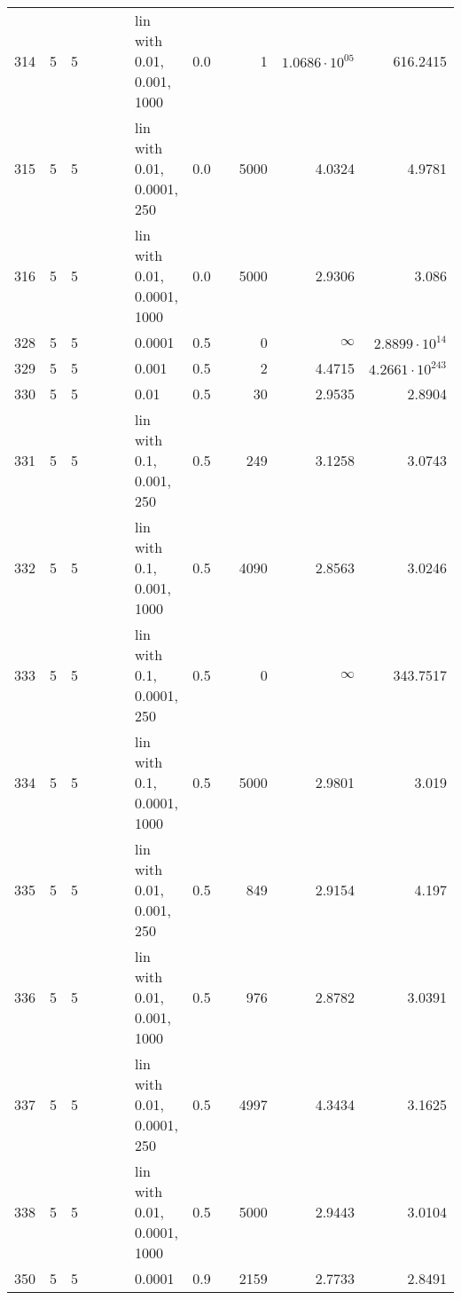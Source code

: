 \begin{longtable}{lrrrrrlrrrrr}
 314 &       5 & 5 &   &   &   &  lin with 0.01, 0.001, 1000 &  0.0 &        &       1 &  $1.0686\cdot 10^{05}$ &               616.2415 \\
 315 &       5 & 5 &   &   &   &  lin with 0.01, 0.0001, 250 &  0.0 &        &    5000 &                 4.0324 &                 4.9781 \\
 316 &       5 & 5 &   &   &   & lin with 0.01, 0.0001, 1000 &  0.0 &        &    5000 &                 2.9306 &                  3.086 \\
 328 &       5 & 5 &   &   &   &                      0.0001 &  0.5 &        &       0 &               $\infty$ &  $2.8899\cdot 10^{14}$ \\
 329 &       5 & 5 &   &   &   &                       0.001 &  0.5 &        &       2 &                 4.4715 & $4.2661\cdot 10^{243}$ \\
 330 &       5 & 5 &   &   &   &                        0.01 &  0.5 &        &      30 &                 2.9535 &                 2.8904 \\
 331 &       5 & 5 &   &   &   &    lin with 0.1, 0.001, 250 &  0.5 &        &     249 &                 3.1258 &                 3.0743 \\
 332 &       5 & 5 &   &   &   &   lin with 0.1, 0.001, 1000 &  0.5 &        &    4090 &                 2.8563 &                 3.0246 \\
 333 &       5 & 5 &   &   &   &   lin with 0.1, 0.0001, 250 &  0.5 &        &       0 &               $\infty$ &               343.7517 \\
 334 &       5 & 5 &   &   &   &  lin with 0.1, 0.0001, 1000 &  0.5 &        &    5000 &                 2.9801 &                  3.019 \\
 335 &       5 & 5 &   &   &   &   lin with 0.01, 0.001, 250 &  0.5 &        &     849 &                 2.9154 &                  4.197 \\
 336 &       5 & 5 &   &   &   &  lin with 0.01, 0.001, 1000 &  0.5 &        &     976 &                 2.8782 &                 3.0391 \\
 337 &       5 & 5 &   &   &   &  lin with 0.01, 0.0001, 250 &  0.5 &        &    4997 &                 4.3434 &                 3.1625 \\
 338 &       5 & 5 &   &   &   & lin with 0.01, 0.0001, 1000 &  0.5 &        &    5000 &                 2.9443 &                 3.0104 \\
 350 &       5 & 5 &   &   &   &                      0.0001 &  0.9 &        &    2159 &                 2.7733 &                 2.8491 \\

\end{longtable}
